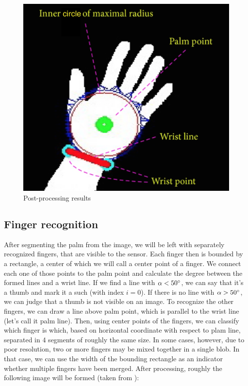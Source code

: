 \documentclass[a4paper,11pt,oneside]{article}
\begin{document}
   \begin{figure}[H]
  \centering
  \includegraphics[scale=0.35]{hand-segmentation.png}
  \caption{Post-processing results}
  \end{figure}
  
  \subsection{Finger recognition}
  
	After segmenting the palm from the image, we will be left with separately recognized fingers, that are visible to the sensor. Each finger then is bounded by a rectangle, a center of which we will call a center point of a finger. We connect each one of those points to the palm point and calculate the degree between the formed lines and a wrist line. If we find a line with $\alpha < 50\degree$, we can say that it's a thumb and mark it a such (with index $i=0$). If there is no line with $\alpha > 50\degree$, we can judge that a thumb is not visible on an image. To recognize the other fingers, we can draw a line above palm point, which is parallel to the wrist line (let's call it palm line). Then, using center points of the fingers, we can classify which finger is which, based on horizontal coordinate with respect to plam line, separated in 4 segments of roughly the same size. In some cases, however, due to poor resolution, two or more fingers may be mixed together in a single blob. In that case, we can use the width of the bounding rectangle as an indicator whether multiple fingers have been merged. After processing, roughly the following image will be formed (taken from \cite{ZH01}):
    
\end{document}
